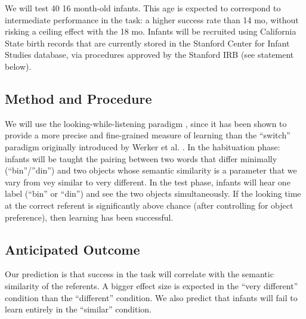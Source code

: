 \documentclass[12pt]{article}
\begin{document}
We will test 40 16 month-old infants. This age is expected to correspond to intermediate performance in the task: a higher success rate than 14 mo, without risking a ceiling effect with the 18 mo. Infants will be recruited using California State birth records that are currently stored in the Stanford Center for Infant Studies database, via procedures approved by the Stanford IRB (see statement below). 

\subsection{Method and Procedure}

We will use the looking-while-listening paradigm  \cite{fernald2008}, since it has been shown to provide a more precise and fine-grained measure of learning than the ``switch'' paradigm originally introduced by Werker et al.  \cite{yoshida2009}. In the habituation phase: infants will be taught the pairing between two words that differ minimally (``bin''/''din'') and two objects whose semantic similarity is a parameter that we vary from vey similar to very different. In the test phase, infants will hear one label (``bin'' or ``din'') and see the two objects simultaneously. If the looking time at the correct referent is significantly above chance (after controlling for object preference), then learning has been successful. 

\subsection{Anticipated Outcome}

Our prediction is that success in the task will correlate with the semantic similarity of the referents. A bigger effect size is expected in the ``very different'' condition than the ``different'' condition. We also predict that infants will fail to learn entirely in the ``similar'' condition.


\end{document}
